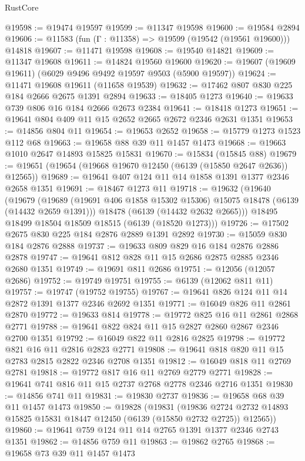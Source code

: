 \begin{lexlean}{RustCore}
\begin{coremodule}
@19598 := @19474 @19597
@19599 := @11347 @19598
@19600 := @19584 @2894
@19606 := @11583 (fun (Γ : @11358) => @19599 (@19542 (@19561 @19600))) @14818
@19607 := @11471 @19598
@19608 := @19540 @14821
@19609 := @11347 @19608
@19611 := @14824 @19560 @19600
@19620 := @19607 (@19609 @19611) (@6029 @9496 @9492 @19597 @9503 (@5900 @19597))
@19624 := @11471 @19608 @19611 (@11658 @19539)
@19632 := @17462 @807 @830 @225 @184 @2666 @2675 @1391 @2894
@19633 := @18405 @1273
@19640 := @19633 @739 @806 @16 @184 @2666 @2673 @2384
@19641 := @18418 @1273
@19651 := @19641 @804 @409 @11 @15 @2652 @2665 @2672 @2346 @2631 @1351
@19653 := @14856 @804 @11
@19654 := @19653 @2652
@19658 := @15779 @1273 @1523 @112 @68
@19663 := @19658 @88 @39 @11 @1457 @1473
@19668 := @19663 @1010 @2647 @14893 @15825 @15831
@19670 := @15834 (@15845 @88)
@19679 := @19651 (@19654 (@19668 @19670 @12450 (@6139 (@15850 @2647 @2636)) @12565))
@19689 := @19641 @407 @124 @11 @14 @1858 @1391 @1377 @2346 @2658 @1351
@19691 := @18467 @1273 @11
@19718 := @19632
    (@19640
      (@19679
        (@19689 (@19691 @406 @1858 @15302 @15306) @15075 @18478 (@6139 (@14432 @2659 @1391)))
        @18478
        (@6139 (@14432 @2632 @2665)))
      @18495
      @18499
      @18504
      @18509
      @18515
      (@6139 (@18520 @1273)))
@19726 := @17502 @2675 @830 @225 @184 @2876 @2889 @1391 @2892
@19730 := @15059 @830 @184 @2876 @2888
@19737 := @19633 @809 @829 @16 @184 @2876 @2886 @2878
@19747 := @19641 @812 @828 @11 @15 @2686 @2875 @2885 @2346 @2680 @1351
@19749 := @19691 @811 @2686
@19751 := @12056 (@12057 @2686)
@19752 := @19749 @19751
@19755 := @6139 (@12062 @811 @11)
@19757 := @19747 (@19752 @19755)
@19767 := @19641 @826 @124 @11 @14 @2872 @1391 @1377 @2346 @2692 @1351
@19771 := @16049 @826 @11 @2861 @2870
@19772 := @19633 @814
@19778 := @19772 @825 @16 @11 @2861 @2868 @2771
@19788 := @19641 @822 @824 @11 @15 @2827 @2860 @2867 @2346 @2700 @1351
@19792 := @16049 @822 @11 @2816 @2825
@19798 := @19772 @821 @16 @11 @2816 @2823 @2771
@19808 := @19641 @818 @820 @11 @15 @2783 @2815 @2822 @2346 @2708 @1351
@19812 := @16049 @818 @11 @2769 @2781
@19818 := @19772 @817 @16 @11 @2769 @2779 @2771
@19828 := @19641 @741 @816 @11 @15 @2737 @2768 @2778 @2346 @2716 @1351
@19830 := @14856 @741 @11
@19831 := @19830 @2737
@19836 := @19658 @68 @39 @11 @1457 @1473
@19850 := @19828
    (@19831
      (@19836 @2724 @2732 @14893 @15825 @15831 @18447 @12450 (@6139 (@15850 @2732 @2725)) @12565))
@19860 := @19641 @759 @124 @11 @14 @2765 @1391 @1377 @2346 @2743 @1351
@19862 := @14856 @759 @11
@19863 := @19862 @2765
@19868 := @19658 @73 @39 @11 @1457 @1473

\end{coremodule}
\end{lexlean}
